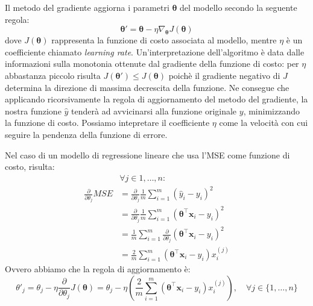 Il metodo del gradiente aggiorna i parametri $\bm \theta$ del modello secondo
la seguente regola: 
\begin{equation} \label{eq:grad-up}
  \bm \theta' = \bm \theta - \eta \nabla_{\bm \theta} J(\bm \theta) 
\end{equation}
dove $J(\bm \theta)$ rappresenta la funzione di costo associata al modello,
mentre $\eta$ è un coefficiente chiamato \emph{learning rate}.
Un'interpretazione dell'algoritmo è data dalle informazioni sulla monotonia
ottenute dal gradiente della funzione di costo: per $\eta$ abbastanza piccolo
risulta $J(\bm \theta') \leq J(\bm \theta)$ poichè il gradiente negativo di $J$
determina la direzione di massima decrescita della funzione\cite{goodfellow}.
Ne consegue che applicando ricorsivamente la regola di aggiornamento del metodo
del gradiente, la nostra funzione $\hat{y}$ tenderà ad avvicinarsi alla
funzione originale $y$, minimizzando la funzione di costo.
Possiamo intepretare il coefficiente $\eta$ come la velocità con cui seguire la
pendenza della funzione di errore.

Nel caso di un modello di regressione lineare che usa l'MSE come funzione di
costo, risulta: 
\begin{align*}
  & \forall j \in {1, \dotsc, n}: \\
  \frac{\partial}{\partial\theta_j} MSE &= 
  \frac{\partial}{\partial\theta_j} \frac{1}{m} \sum_{i=1}^m{{(\hat{y}_i -
    y_i)}^2} \\ 
  &= \frac{\partial}{\partial\theta_j} \frac{1}{m}
  \sum_{i=1}^m{{(\bm \theta^\intercal \bm x_i - y_i)}^2} \\
  &= \frac{1}{m}
  \sum_{i=1}^m{\frac{\partial}{\partial\theta_j}{(\bm \theta^\intercal \bm x_i -
    y_i)}^2} \\
  &= \frac{2}{m}
  \sum_{i=1}^m{(\bm \theta^\intercal \bm x_i - y_i)x_i^{(j)}}
\end{align*}
%
Ovvero abbiamo che la regola di aggiornamento è:
\[ \theta'_j = \theta_j - \eta \frac{\partial}{\partial\theta_j} J(\bm \theta)
             = \theta_j - \eta (\frac{2}{m} 
             \sum_{i=1}^m{(\bm \theta^\intercal \bm x_i - y_i)x_i^{(j)}}),
             \quad \forall j \in \{1, \dotsc, n\}
           \]

